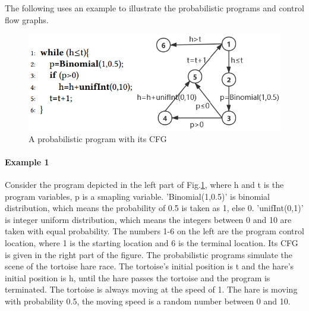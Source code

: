 \documentclass[sigconf,review, anonymous]{acmart}
\begin{document}
The following uses an example to illustrate the probabilistic programs and control flow graphs.

\begin{figure}[h]
	\centering
	\includegraphics[scale=0.7]{img/example}
	\caption{A probabilistic program with its CFG}
	\label{example1}
\end{figure}

\paragraph{Example 1} Consider the program depicted in the left part of Fig.\ref{example1}, where h and t is the program variables, p is a smapling variable. 'Binomial(1,0.5)' is binomial distribution, which means the probability of 0.5 is taken as 1, else 0. 'unifInt(0,1)' is integer uniform distribution, which means the integers between 0 and 10 are taken with equal probability. The numbers 1-6 on the left are the program control location, where 1 is the starting location and 6 is the terminal location. Its CFG is given in the right part of the figure. The probabilistic programs simulate the scene of the tortoise hare race. The tortoise's initial position is t and the hare's initial position is h, until the hare passes the tortoise and the program is terminated. The tortoise is always moving at the speed of 1. The hare is moving with probability 0.5, the moving speed is a random number between 0 and 10.
\end{document}
